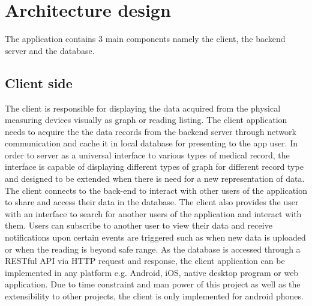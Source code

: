 \section{Architecture design}
\label{sec:Architecture design}
The application contains 3 main components namely the client, the backend server and the database.

\subsection{Client side}
The client is responsible for displaying the data acquired from the physical measuring devices visually as graph or
reading listing. The client application needs to acquire the the data records from the backend server through network
communication and cache it in local database for presenting to the app user. In order to server as a universal interface to
various types of medical record, the interface is capable of displaying different types of graph for different record
type and designed to be extended when there is need for a new representation of data. The client connects 
to the back-end to interact with other users of the application to share and access their data in the database. The
client also provides the user with an interface to search for another users of the application and interact with them.
Users can subscribe to another user to view their data and receive notifications upon certain events are triggered such
as when new data is uploaded or when the reading is beyond safe range. As the database is accessed through a RESTful API
via HTTP request and response, the client application can be implemented in any platform e.g. Android, iOS, native
desktop program or web application. Due to time constraint and man power of this project as well as the extensibility to
other projects, the client is only implemented for android phones.

